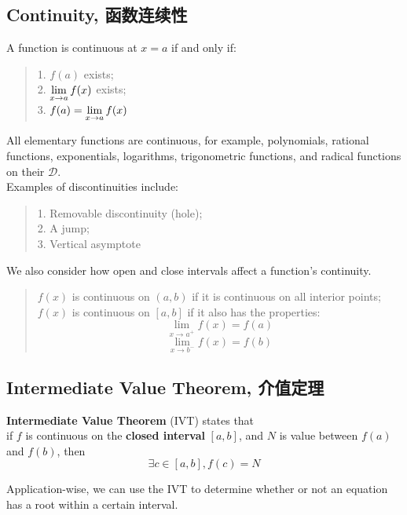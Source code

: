 \subsection{Continuity, 函数连续性}
A function is continuous at $x=a$ if and only if:
\begin{quote}
    1. $f(a)$ exists; \\
    2. $\displaystyle \lim_{x \to a} f(x)$ exists; \\
    3. $f(a) = \displaystyle \lim_{x \to a} f(x)$
\end{quote}
All elementary functions are continuous, for example, polynomials, rational functions, exponentials, logarithms, trigonometric functions, and radical functions on their $\mathscr{D}$. \\
Examples of discontinuities include:
\begin{quote}
    1. Removable discontinuity (hole); \\
    2. A jump; \\
    3. Vertical asymptote
\end{quote}
We also consider how open and close intervals affect a function's continuity.
\begin{quote}
    $f(x)$ is continuous on $(a, b)$ if it is continuous on all interior points; \\
    $f(x)$ is continuous on $[a, b]$ if it also has the properties:
    $$\lim_{x \to a^+} f(x) = f(a)$$
    $$\lim_{x \to b^-} f(x) = f(b)$$
\end{quote}

\subsection{Intermediate Value Theorem, 介值定理}
\begin{theorem}
    \textbf{Intermediate Value Theorem} (IVT) states that \\
    if $f$ is continuous on the \textbf{closed interval} $[a, b]$, and $N$ is value between $f(a)$ and $f(b)$, then
    $$\exists c \in [a, b], f(c) = N$$
\end{theorem}
Application-wise, we can use the IVT to determine whether or not an equation has a root within a certain interval.

